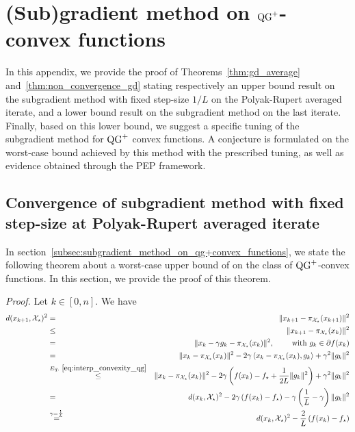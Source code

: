\section{\texorpdfstring{(Sub)gradient method on $\operatorname{QG}^+$-convex functions}{(Sub)-gradient method on QG+ convex functions}}
\label{apx:subgrad}

    In this appendix, we provide the proof of Theorems~\ref{thm:gd_average} and~\ref{thm:non_convergence_gd} stating respectively an upper bound result on the subgradient method with fixed step-size $1 / L$ on the Polyak-Rupert averaged iterate, and a lower bound result on the subgradient method on the last iterate.
    Finally, based on this lower bound, we suggest a specific tuning of the subgradient method for $\operatorname{QG}^+$ convex functions.
    A conjecture is formulated on the worst-case bound achieved by this method with the prescribed tuning, as well as evidence obtained through the PEP framework.
    
    \subsection{Convergence of subgradient method with fixed step-size at Polyak-Rupert averaged iterate}
    \label{apx:gd_proof_th1_upper_bound}

        In section~\ref{subsec:subgradient_method_on_qg+convex_functions}, we state the following theorem about a worst-case upper bound of  on the class of $\operatorname{QG}^+$-convex functions.
        In this section, we provide the proof of this theorem.
        
        \convergenceofsubgradientmethodinaverage*
    
        \noindent \textit{Proof.}
            Let $k \in [0, n]$.
            We have
            \begin{eqnarray*}
                d(x_{k+1}, \mathcal{X}_\star)^2 & = & \|x_{k+1} - \pi_{\mathcal{X}_\star}(x_{k+1})\|^2 \\
                & \leq & \|x_{k+1} - \pi_{\mathcal{X}_\star}(x_{k})\|^2 \\
                & = & \|x_k - \gamma g_k -  \pi_{\mathcal{X}_\star}(x_{k})\|^2, \qquad \text{ with } g_k \in \partial f(x_k) \\
                & = & \|x_k - \pi_{\mathcal{X}_\star}(x_{k})\|^2 - 2\gamma \left< x_k - \pi_{\mathcal{X}_\star}(x_{k}) , g_k \right> + \gamma^2 \|g_k\|^2 \\
                & \overset{Eq.~\eqref{eq:interp_convexity_qg}}{\leq} & \|x_k - \pi_{\mathcal{X}_\star}(x_{k})\|^2 - 2\gamma \left(f(x_k) - f_\star + \frac{1}{2L}\|g_k\|^2\right) + \gamma^2 \|g_k\|^2 \\
                & = & d(x_k, \mathcal{X}_\star)^2 - 2\gamma \left(f(x_k) - f_\star \right) - \gamma \left( \frac{1}{L} - \gamma \right) \|g_k\|^2 \\
                & \overset{\gamma=\frac{1}{L}}{=} & d(x_k, \mathcal{X}_\star)^2 - \frac{2}{L} \left(f(x_k) - f_\star \right)
            \end{eqnarray*}
            
